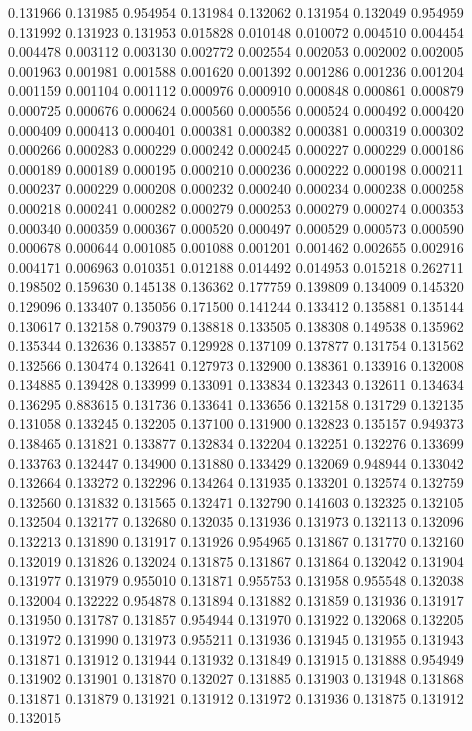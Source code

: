 0.131966
0.131985
0.954954
0.131984
0.132062
0.131954
0.132049
0.954959
0.131992
0.131923
0.131953
0.015828
0.010148
0.010072
0.004510
0.004454
0.004478
0.003112
0.003130
0.002772
0.002554
0.002053
0.002002
0.002005
0.001963
0.001981
0.001588
0.001620
0.001392
0.001286
0.001236
0.001204
0.001159
0.001104
0.001112
0.000976
0.000910
0.000848
0.000861
0.000879
0.000725
0.000676
0.000624
0.000560
0.000556
0.000524
0.000492
0.000420
0.000409
0.000413
0.000401
0.000381
0.000382
0.000381
0.000319
0.000302
0.000266
0.000283
0.000229
0.000242
0.000245
0.000227
0.000229
0.000186
0.000189
0.000189
0.000195
0.000210
0.000236
0.000222
0.000198
0.000211
0.000237
0.000229
0.000208
0.000232
0.000240
0.000234
0.000238
0.000258
0.000218
0.000241
0.000282
0.000279
0.000253
0.000279
0.000274
0.000353
0.000340
0.000359
0.000367
0.000520
0.000497
0.000529
0.000573
0.000590
0.000678
0.000644
0.001085
0.001088
0.001201
0.001462
0.002655
0.002916
0.004171
0.006963
0.010351
0.012188
0.014492
0.014953
0.015218
0.262711
0.198502
0.159630
0.145138
0.136362
0.177759
0.139809
0.134009
0.145320
0.129096
0.133407
0.135056
0.171500
0.141244
0.133412
0.135881
0.135144
0.130617
0.132158
0.790379
0.138818
0.133505
0.138308
0.149538
0.135962
0.135344
0.132636
0.133857
0.129928
0.137109
0.137877
0.131754
0.131562
0.132566
0.130474
0.132641
0.127973
0.132900
0.138361
0.133916
0.132008
0.134885
0.139428
0.133999
0.133091
0.133834
0.132343
0.132611
0.134634
0.136295
0.883615
0.131736
0.133641
0.133656
0.132158
0.131729
0.132135
0.131058
0.133245
0.132205
0.137100
0.131900
0.132823
0.135157
0.949373
0.138465
0.131821
0.133877
0.132834
0.132204
0.132251
0.132276
0.133699
0.133763
0.132447
0.134900
0.131880
0.133429
0.132069
0.948944
0.133042
0.132664
0.133272
0.132296
0.134264
0.131935
0.133201
0.132574
0.132759
0.132560
0.131832
0.131565
0.132471
0.132790
0.141603
0.132325
0.132105
0.132504
0.132177
0.132680
0.132035
0.131936
0.131973
0.132113
0.132096
0.132213
0.131890
0.131917
0.131926
0.954965
0.131867
0.131770
0.132160
0.132019
0.131826
0.132024
0.131875
0.131867
0.131864
0.132042
0.131904
0.131977
0.131979
0.955010
0.131871
0.955753
0.131958
0.955548
0.132038
0.132004
0.132222
0.954878
0.131894
0.131882
0.131859
0.131936
0.131917
0.131950
0.131787
0.131857
0.954944
0.131970
0.131922
0.132068
0.132205
0.131972
0.131990
0.131973
0.955211
0.131936
0.131945
0.131955
0.131943
0.131871
0.131912
0.131944
0.131932
0.131849
0.131915
0.131888
0.954949
0.131902
0.131901
0.131870
0.132027
0.131885
0.131903
0.131948
0.131868
0.131871
0.131879
0.131921
0.131912
0.131972
0.131936
0.131875
0.131912
0.132015
